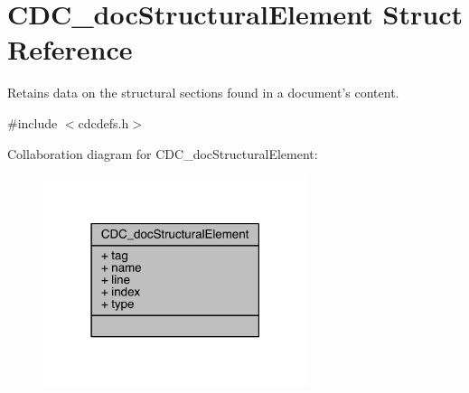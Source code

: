 \hypertarget{struct_c_d_c__doc_structural_element}{\section{C\+D\+C\+\_\+doc\+Structural\+Element Struct Reference}
\label{struct_c_d_c__doc_structural_element}
}


Retains data on the structural sections found in a document's content.  




{\ttfamily \#include $<$cdcdefs.\+h$>$}



Collaboration diagram for C\+D\+C\+\_\+doc\+Structural\+Element\+:\nopagebreak
\begin{figure}[H]
\begin{center}
\leavevmode
\includegraphics[width=219pt]{struct_c_d_c__doc_structural_element__coll__graph}
\end{center}
\end{figure}
